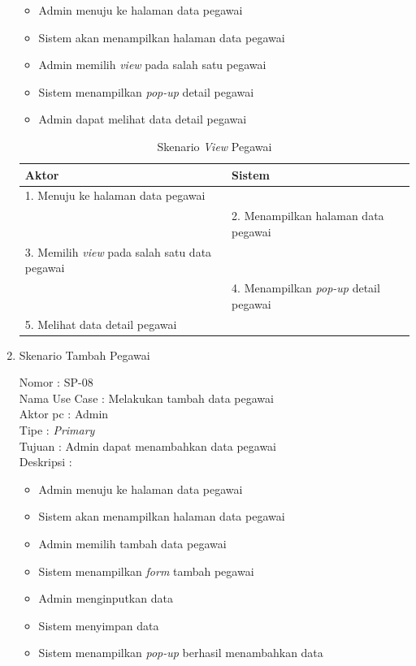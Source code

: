 \begin{enumerate}
\begin{itemize}
	\item Admin menuju ke halaman data pegawai
	\item Sistem akan menampilkan halaman data pegawai
	\item Admin memilih \textit{view} pada salah satu pegawai
	\item Sistem menampilkan \textit{pop-up} detail pegawai
	\item Admin dapat melihat data detail pegawai
	
\end{itemize}

\begin{table}
	\caption{Skenario \textit{View} Pegawai}
	\centering
	\begin{tabular}{ | p{60mm} | p{68mm} |}
		\hline 
		\textbf{Aktor} & \textbf{Sistem} \\
		\hline
		
		1.	Menuju ke halaman data pegawai &  \\
		
		\hline
		
		&  2.	Menampilkan halaman data pegawai \\
		
		\hline
		
		3. Memilih \textit{view} pada salah satu data pegawai & \\
		
		\hline
		
		& 4.	Menampilkan \textit{pop-up} detail pegawai \\
		
		\hline
		
		5.	Melihat data detail pegawai  & \\
		\hline
		
		
	\end{tabular}
\end{table}

\item Skenario Tambah Pegawai

Nomor \kern 3.6pc : SP-08 \\
Nama Use Case : Melakukan tambah data pegawai \\
Aktor  pc : Admin \\
Tipe \kern 4.6pc : \textit{Primary} \\
Tujuan \kern 3.6pc : Admin dapat menambahkan data pegawai \\
Deskripsi \kern 2.5pc : 

\begin{itemize}
	\item Admin menuju ke halaman data pegawai
	\item Sistem akan menampilkan halaman data pegawai
	\item Admin memilih tambah data pegawai
	\item Sistem menampilkan \textit{form} tambah pegawai
	\item Admin menginputkan data
	\item Sistem menyimpan data
	\item Sistem menampilkan \textit{pop-up} berhasil menambahkan data
	

\end{itemize}
\end{enumerate}
